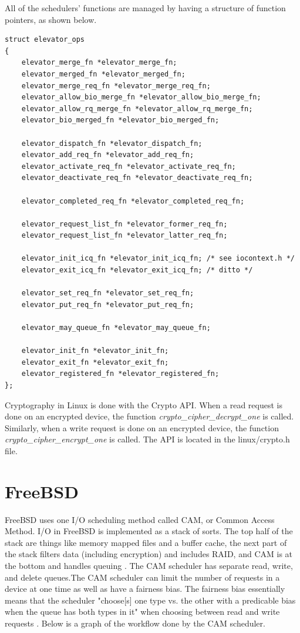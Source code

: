 \documentclass[10pt,draftclsnofoot,onecolumn,journal,compsoc]{IEEEtran}
\begin{document}
All of the schedulers' functions are managed by having a structure of function pointers, as shown below.

\begin{lstlisting}[caption={The \textit{elevator\_ops} structure in the linux/elevator.h file}]
struct elevator_ops
{
	elevator_merge_fn *elevator_merge_fn;
	elevator_merged_fn *elevator_merged_fn;
	elevator_merge_req_fn *elevator_merge_req_fn;
	elevator_allow_bio_merge_fn *elevator_allow_bio_merge_fn;
	elevator_allow_rq_merge_fn *elevator_allow_rq_merge_fn;
	elevator_bio_merged_fn *elevator_bio_merged_fn;

	elevator_dispatch_fn *elevator_dispatch_fn;
	elevator_add_req_fn *elevator_add_req_fn;
	elevator_activate_req_fn *elevator_activate_req_fn;
	elevator_deactivate_req_fn *elevator_deactivate_req_fn;

	elevator_completed_req_fn *elevator_completed_req_fn;

	elevator_request_list_fn *elevator_former_req_fn;
	elevator_request_list_fn *elevator_latter_req_fn;

	elevator_init_icq_fn *elevator_init_icq_fn;	/* see iocontext.h */
	elevator_exit_icq_fn *elevator_exit_icq_fn;	/* ditto */

	elevator_set_req_fn *elevator_set_req_fn;
	elevator_put_req_fn *elevator_put_req_fn;

	elevator_may_queue_fn *elevator_may_queue_fn;

	elevator_init_fn *elevator_init_fn;
	elevator_exit_fn *elevator_exit_fn;
	elevator_registered_fn *elevator_registered_fn;
};
\end{lstlisting}

Cryptography in Linux is done with the Crypto API. When a read request is done on an encrypted device, the function \textit{crypto\_cipher\_decrypt\_one} is called. Similarly, when a write request is done on an encrypted device, the function \textit{crypto\_cipher\_encrypt\_one} is called. The API is located in the linux/crypto.h file.

\section{FreeBSD}
FreeBSD uses one I/O scheduling method called CAM, or Common Access Method. I/O in FreeBSD is implemented as a stack of sorts. The top half of the stack are things like memory mapped files and a buffer cache, the next part of the stack filters data (including encryption) and includes RAID, and CAM is at the bottom and handles queuing \cite{bsd1}. The CAM scheduler has separate read, write, and delete queues.The CAM scheduler can limit the number of requests in a device at one time as well as have a fairness bias. The fairness bias essentially means that the scheduler "choose[s] one type vs. the other with a predicable bias when the
queue has both types in it" when choosing between read and write requests \cite{bsd2}. Below is a graph of the workflow done by the CAM scheduler.
\end{document}
